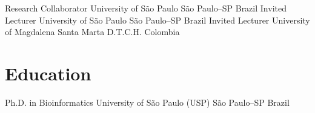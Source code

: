 \documentclass[11pt, letterpaper, sans]{moderncv}
\begin{document}
    {Research Collaborator}
    {University of São Paulo}
    {São Paulo--SP}
    {Brazil}
    {}
%
    {Invited Lecturer}
    {University of São Paulo}
    {São Paulo--SP}
    {Brazil}
    {}
%
    {Invited Lecturer}
    {University of Magdalena}
    {Santa Marta D.T.C.H.}
    {Colombia}
    {
    }


\section{Education}

    {Ph.D. in Bioinformatics}
    {University of São Paulo (USP)}
    {São Paulo--SP}
    {Brazil}
    {}
\end{document}
